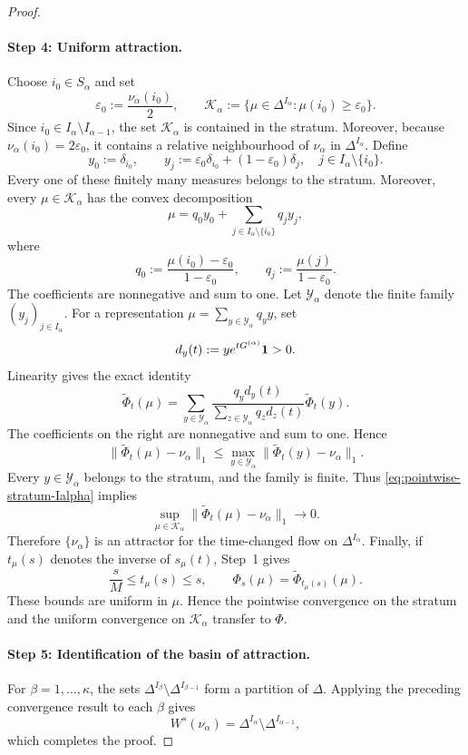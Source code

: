 \documentclass[10pt,letterpaper]{article}
\theoremstyle{compactplain}
\theoremstyle{compactdefinition}
\newcommand{\1}{\mathds{1}}
\begin{document}
\begin{proof}
\paragraph{Step 4: Uniform attraction.}
Choose $i_0\in S_\alpha$ and set
\[
\varepsilon_0:=\frac{\nu_\alpha(i_0)}{2},
\qquad
\mathcal K_\alpha
:=
\{\mu\in\Delta^{I_\alpha}:\mu(i_0)\geq\varepsilon_0\}.
\]
Since $i_0\in I_\alpha\setminus I_{\alpha-1}$, the set
$\mathcal K_\alpha$ is contained in the stratum. Moreover, because
$\nu_\alpha(i_0)=2\varepsilon_0$, it contains a relative neighbourhood of
$\nu_\alpha$ in $\Delta^{I_\alpha}$. Define
\[
y_0:=\delta_{i_0},
\qquad
y_j:=\varepsilon_0\delta_{i_0}+(1-\varepsilon_0)\delta_j,
\quad j\in I_\alpha\setminus\{i_0\}.
\]
Every one of these finitely many measures belongs to the stratum. Moreover,
every $\mu\in\mathcal K_\alpha$ has the convex decomposition
\[
\mu
=
q_0y_0+
\sum_{j\in I_\alpha\setminus\{i_0\}}q_jy_j,
\]
where
\[
q_0:=\frac{\mu(i_0)-\varepsilon_0}{1-\varepsilon_0},
\qquad
q_j:=\frac{\mu(j)}{1-\varepsilon_0}.
\]
The coefficients are nonnegative and sum to one. Let $\mathcal Y_\alpha$ denote the finite family \((y_j)_{j\in I_\alpha}\). For a representation
$\mu=\sum_{y\in\mathcal Y_\alpha}q_y y$, set
\[
d_y(t):=ye^{tG^{(\alpha)}}{\bf 1}>0.
\]
Linearity gives the exact identity
\[
\widetilde\Phi_t(\mu)
=
\sum_{y\in\mathcal Y_\alpha}
\frac{q_yd_y(t)}
     {\sum_{z\in\mathcal Y_\alpha}q_zd_z(t)}
\widetilde\Phi_t(y).
\]
The coefficients on the right are nonnegative and sum to one. Hence
\[
\|\widetilde\Phi_t(\mu)-\nu_\alpha\|_1
\leq
\max_{y\in\mathcal Y_\alpha}
\|\widetilde\Phi_t(y)-\nu_\alpha\|_1.
\]
Every $y\in\mathcal Y_\alpha$ belongs to the stratum, and the family is
finite. Thus \eqref{eq:pointwise-stratum-Ialpha} implies
\[
\sup_{\mu\in\mathcal K_\alpha}
\|\widetilde\Phi_t(\mu)-\nu_\alpha\|_1
\longrightarrow0.
\]
Therefore $\{\nu_\alpha\}$ is an attractor for the time-changed flow on
$\Delta^{I_\alpha}$. Finally, if $t_\mu(s)$ denotes the inverse of $s_\mu(t)$, Step~1 gives
\[
\frac{s}{M}\leq t_\mu(s)\leq s,
\qquad
\Phi_s(\mu)=\widetilde\Phi_{t_\mu(s)}(\mu).
\]
These bounds are uniform in $\mu$. Hence the pointwise convergence on the
stratum and the uniform convergence on $\mathcal K_\alpha$ transfer to
$\Phi$.


\paragraph{Step 5: Identification of the basin of attraction.}
For $\beta=1,\ldots,\kappa$, the sets
$\Delta^{I_\beta}\setminus\Delta^{I_{\beta-1}}$ form a partition of
$\Delta$. Applying the preceding convergence result to each $\beta$ gives
\[
W^s(\nu_\alpha)
=
\Delta^{I_\alpha}\setminus\Delta^{I_{\alpha-1}},
\]
which completes the proof.
\end{proof}
\end{document}
